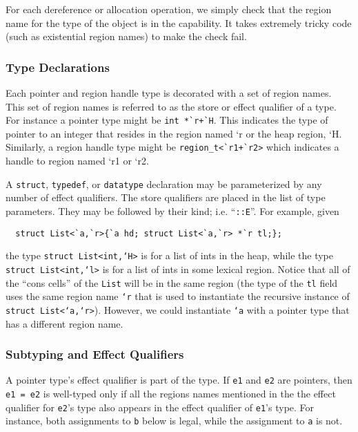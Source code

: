 For each dereference or allocation operation, we simply check that the
region name for the type of the object is in the capability.  It takes
extremely tricky code (such as existential region names) to make the
check fail.


\subsubsection{Type Declarations}

Each pointer and region handle type is decorated with a set of region
names. This set of region names is referred to as the store or effect
qualifier of a type. For instance a pointer type might be
\verb^int *`r+`H^. This indicates the type of pointer to an integer
that resides in the region named `r or the heap region, `H. Similarly,
a region handle type might be \verb^region_t<`r1+`r2>^ which indicates
a handle to region named `r1 or `r2.

A \texttt{struct}, \texttt{typedef}, or \texttt{datatype} declaration
may be parameterized by any number of effect qualifiers.  The store
qualifiers are placed in the list of type parameters.  They may be
followed by their kind; i.e. ``\texttt{::E}''. For example, given
\begin{verbatim}
  struct List<`a,`r>{`a hd; struct List<`a,`r> *`r tl;};
\end{verbatim}
the type \texttt{struct List<int,`H>} is for a list of ints in the
heap, while the type \texttt{struct List<int,`l>} is for a list of
ints in some lexical region.  Notice that all of the ``cons cells'' of
the \texttt{List} will be in the same region (the type of the
\texttt{tl} field uses the same region name \texttt{`r} that is used
to instantiate the recursive instance of \texttt{struct List<`a,`r>}).
However, we could instantiate \texttt{`a} with a pointer type that has
a different region name.


\subsubsection{Subtyping and Effect Qualifiers}
\label{sec:effectqualifiers}

A pointer type's effect qualifier is part of the type.  If \texttt{e1}
and \texttt{e2} are pointers, then \texttt{e1 = e2} is well-typed only
if all the regions names mentioned in the the effect qualifier for
\texttt{e2}'s type also appears in the effect qualifier of
\texttt{e1}'s type. For instance, both assignments to {\tt b} below is
legal, while the assignment to {\tt a} is not. 

